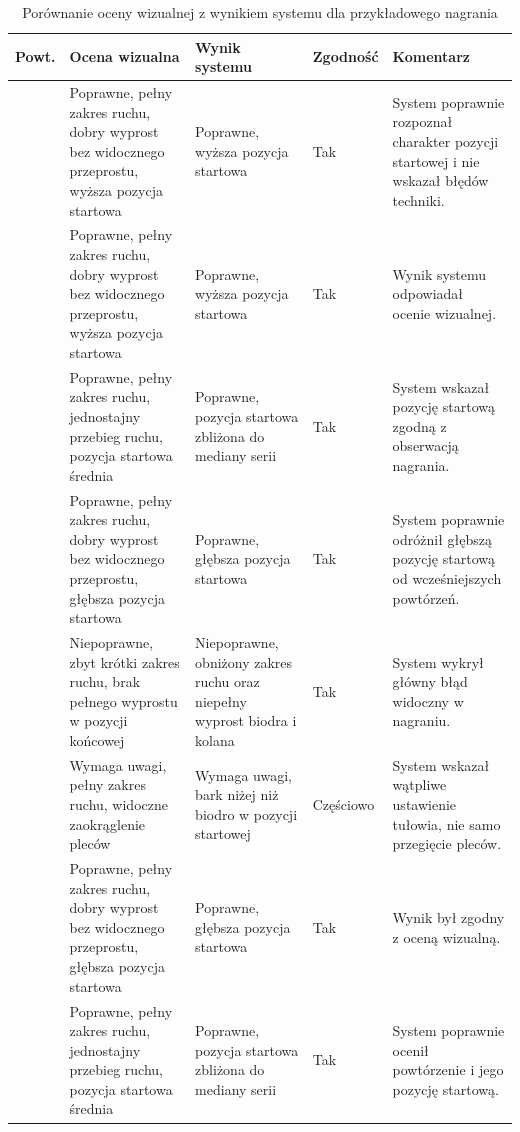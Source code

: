 \begin{table}[H]
\centering
\caption{Porównanie oceny wizualnej z wynikiem systemu dla przykładowego nagrania}
\label{tab:porownanie-oceny-powtorzen}
\footnotesize
\renewcommand{\arraystretch}{1.08}
\setlength{\tabcolsep}{2.5pt}
\begin{tabular}{|
>{\centering\arraybackslash}p{1.05cm}|
>{\raggedright\arraybackslash}p{4.25cm}|
>{\raggedright\arraybackslash}p{3.95cm}|
>{\centering\arraybackslash}p{1.65cm}|
>{\raggedright\arraybackslash}p{3.85cm}|}
\hline
\textbf{Powt.} & \textbf{Ocena wizualna} & \textbf{Wynik systemu} & \textbf{Zgodność} & \textbf{Komentarz} \\ \hline
1 & Poprawne, pełny zakres ruchu, dobry wyprost bez widocznego przeprostu, wyższa pozycja startowa & Poprawne, wyższa pozycja startowa & Tak & System poprawnie rozpoznał charakter pozycji startowej i nie wskazał błędów techniki. \\ \hline
2 & Poprawne, pełny zakres ruchu, dobry wyprost bez widocznego przeprostu, wyższa pozycja startowa & Poprawne, wyższa pozycja startowa & Tak & Wynik systemu odpowiadał ocenie wizualnej. \\ \hline
3 & Poprawne, pełny zakres ruchu, jednostajny przebieg ruchu, pozycja startowa średnia & Poprawne, pozycja startowa zbliżona do mediany serii & Tak & System wskazał pozycję startową zgodną z obserwacją nagrania. \\ \hline
4 & Poprawne, pełny zakres ruchu, dobry wyprost bez widocznego przeprostu, głębsza pozycja startowa & Poprawne, głębsza pozycja startowa & Tak & System poprawnie odróżnił głębszą pozycję startową od wcześniejszych powtórzeń. \\ \hline
5 & Niepoprawne, zbyt krótki zakres ruchu, brak pełnego wyprostu w pozycji końcowej & Niepoprawne, obniżony zakres ruchu oraz niepełny wyprost biodra i kolana & Tak & System wykrył główny błąd widoczny w nagraniu. \\ \hline
6 & Wymaga uwagi, pełny zakres ruchu, widoczne zaokrąglenie pleców & Wymaga uwagi, bark niżej niż biodro w pozycji startowej & Częściowo & System wskazał wątpliwe ustawienie tułowia, nie samo przegięcie pleców. \\ \hline
7 & Poprawne, pełny zakres ruchu, dobry wyprost bez widocznego przeprostu, głębsza pozycja startowa & Poprawne, głębsza pozycja startowa & Tak & Wynik był zgodny z oceną wizualną. \\ \hline
8 & Poprawne, pełny zakres ruchu, jednostajny przebieg ruchu, pozycja startowa średnia & Poprawne, pozycja startowa zbliżona do mediany serii & Tak & System poprawnie ocenił powtórzenie i jego pozycję startową. \\ \hline
\end{tabular}
\end{table}

